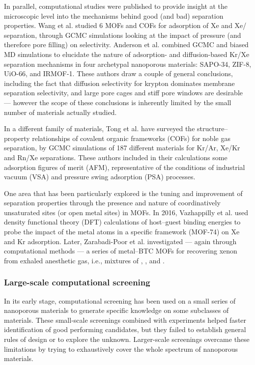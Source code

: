 \documentclass[main.tex]{subfiles}
\begin{document}
In parallel, computational studies were published to provide insight at the microscopic level into the mechanisms behind good (and bad) separation properties. Wang et al.\autocite{Wang_2014} studied 6 MOFs and COFs for adsorption of Xe and Xe/ separation, through GCMC simulations looking at the impact of pressure (and therefore pore filling) on selectivity. Anderson et al.\autocite{Anderson_2017} combined GCMC and biased MD simulations to elucidate the nature of adsorption- and diffusion-based Kr/Xe separation mechanisms in four archetypal nanoporous materials: SAPO-34, ZIF-8, UiO-66, and IRMOF-1. These authors draw a couple of general conclusions, including the fact that diffusion selectivity for krypton dominates membrane separation selectivity, and large pore cages and stiff pore windows are desirable --- however the scope of these conclusions is inherently limited by the small number of materials actually studied.

In a different family of materials, Tong et al.\autocite{Tong_2017} have surveyed the structure--property relationships of covalent organic frameworks (COFs) for noble gas separation, by GCMC simulations of 187 different materials for Kr/Ar, Xe/Kr and Rn/Xe separations. These authors included in their calculations some adsorption figures of merit (AFM), representative of the conditions of industrial vacuum (VSA) and pressure swing adsorption (PSA) processes.

One area that has been particularly explored is the tuning and improvement of separation properties through the presence and nature of coordinatively unsaturated sites (or open metal sites) in MOFs. In 2016, Vazhappilly et al.\autocite{Vazhappilly_2016} used density functional theory (DFT) calculations of host--guest binding energies to probe the impact of the metal atoms in a specific framework (MOF-74) on Xe and Kr adsorption. Later, Zarabadi-Poor et al.\autocite{ZarabadiPoor_2018} investigated --- again through computational methods --- a series of metal--BTC MOFs for recovering xenon from exhaled anesthetic gas, i.e., mixtures of , , and .

\subsubsection{Large-scale computational screening}

In its early stage, computational screening has been used on a small series of nanoporous materials to generate specific knowledge on some subclasses of materials. These small-scale screenings combined with experiments helped faster identification of good performing candidates, but they failed to establish general rules of design or to explore the unknown. Larger-scale screenings overcame these limitations by trying to exhaustively cover the whole spectrum of nanoporous materials.
\end{document}
